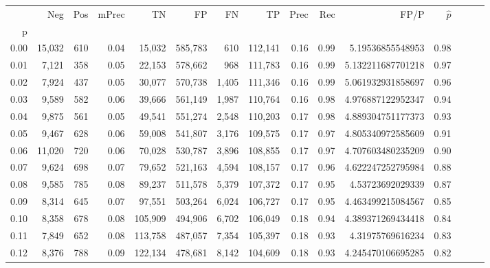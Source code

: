 \begin{tabular}{rrrrrrrrrrrrrrr}
\toprule
{} &     Neg &    Pos & mPrec &       TN &       FP &       FN &       TP &  Prec &   Rec &                  FP/P & $\hat{p}$ \\
p    &         &        &       &          &          &          &          &       &       &                       &           \\
\midrule
0.00 &  15,032 &    610 &  0.04 &   15,032 &  585,783 &      610 &  112,141 &  0.16 &  0.99 &      5.19536855548953 &      0.98 \\
0.01 &   7,121 &    358 &  0.05 &   22,153 &  578,662 &      968 &  111,783 &  0.16 &  0.99 &     5.132211687701218 &      0.97 \\
0.02 &   7,924 &    437 &  0.05 &   30,077 &  570,738 &    1,405 &  111,346 &  0.16 &  0.99 &     5.061932931858697 &      0.96 \\
0.03 &   9,589 &    582 &  0.06 &   39,666 &  561,149 &    1,987 &  110,764 &  0.16 &  0.98 &     4.976887122952347 &      0.94 \\
0.04 &   9,875 &    561 &  0.05 &   49,541 &  551,274 &    2,548 &  110,203 &  0.17 &  0.98 &     4.889304751177373 &      0.93 \\
0.05 &   9,467 &    628 &  0.06 &   59,008 &  541,807 &    3,176 &  109,575 &  0.17 &  0.97 &     4.805340972585609 &      0.91 \\
0.06 &  11,020 &    720 &  0.06 &   70,028 &  530,787 &    3,896 &  108,855 &  0.17 &  0.97 &     4.707603480235209 &      0.90 \\
0.07 &   9,624 &    698 &  0.07 &   79,652 &  521,163 &    4,594 &  108,157 &  0.17 &  0.96 &     4.622247252795984 &      0.88 \\
0.08 &   9,585 &    785 &  0.08 &   89,237 &  511,578 &    5,379 &  107,372 &  0.17 &  0.95 &      4.53723692029339 &      0.87 \\
0.09 &   8,314 &    645 &  0.07 &   97,551 &  503,264 &    6,024 &  106,727 &  0.17 &  0.95 &     4.463499215084567 &      0.85 \\
0.10 &   8,358 &    678 &  0.08 &  105,909 &  494,906 &    6,702 &  106,049 &  0.18 &  0.94 &     4.389371269434418 &      0.84 \\
0.11 &   7,849 &    652 &  0.08 &  113,758 &  487,057 &    7,354 &  105,397 &  0.18 &  0.93 &      4.31975769616234 &      0.83 \\
0.12 &   8,376 &    788 &  0.09 &  122,134 &  478,681 &    8,142 &  104,609 &  0.18 &  0.93 &     4.245470106695285 &      0.82 \\

\end{tabular}
